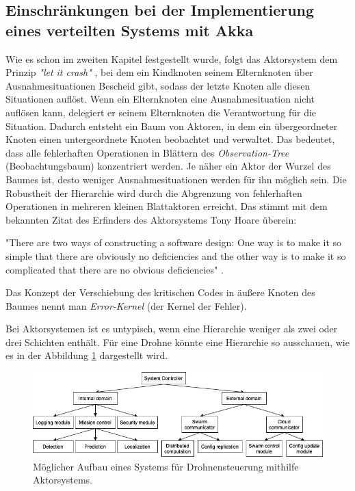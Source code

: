 \subsection{Einschränkungen bei der Implementierung eines verteilten Systems mit Akka}

Wie es schon im zweiten Kapitel festgestellt wurde, folgt das Aktorsystem dem Prinzip \textit{"let it crash"} \cite{Armstrong93concurrentprogramming}, bei dem ein Kindknoten seinem Elternknoten über Ausnahmesituationen Bescheid gibt, sodass der letzte Knoten alle diesen Situationen auflöst. Wenn ein Elternknoten eine Ausnahmesituation nicht auflösen kann, delegiert er seinem Elternknoten die Verantwortung für die Situation. Dadurch entsteht ein Baum von Aktoren, in dem ein übergeordneter Knoten einen untergeordnete Knoten beobachtet und verwaltet. Das bedeutet, dass alle fehlerhaften Operationen in Blättern des \textit{Observation-Tree} (Beobachtungsbaum) konzentriert werden. Je näher ein Aktor der Wurzel des Baumes ist, desto weniger Ausnahmesituationen werden für ihn möglich sein. Die Robustheit der Hierarchie wird durch die Abgrenzung von fehlerhaften Operationen in mehreren kleinen Blattaktoren erreicht. Das stimmt mit dem bekannten Zitat des Erfinders des Aktorsystems Tony Hoare überein:

"There are two ways of constructing a software design: One way is to make it so simple that there are obviously no deficiencies and the other way is to make it so complicated that there are no obvious deficiencies" \cite{Graham_communicatingsequential}.

Das Konzept der Verschiebung des kritischen Codes in äußere Knoten des Baumes nennt man \textit{Error-Kernel} (der Kernel der Fehler).

Bei Aktorsystemen ist es untypisch, wenn eine Hierarchie weniger als zwei oder drei Schichten enthält. Für eine Drohne könnte eine Hierarchie so ausschauen, wie es in der Abbildung \ref{fig:hierarchy1} dargestellt wird.

\begin{figure}
	\centering
	\includegraphics[width=0.7\linewidth]{images/5_hierarchy_1}
	\caption{Möglicher Aufbau eines Systems für Drohnensteuerung mithilfe Aktorsystems.}
	\label{fig:hierarchy1}
\end{figure}

